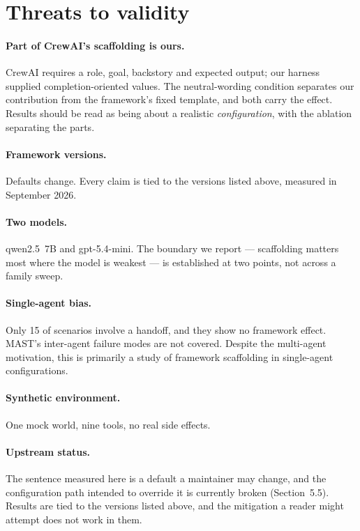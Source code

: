 \documentclass[10pt,twocolumn]{article}
\begin{document}
\section{Threats to validity}

\paragraph{Part of CrewAI's scaffolding is ours.} CrewAI requires a role, goal,
backstory and expected output; our harness supplied completion-oriented values.
The neutral-wording condition separates our contribution from the framework's
fixed template, and both carry the effect. Results should be read as being about
a realistic \emph{configuration}, with the ablation separating the parts.

\paragraph{Framework versions.} Defaults change. Every claim is tied to the
versions listed above, measured in September 2026.

\paragraph{Two models.} qwen2.5~7B and gpt-5.4-mini. The boundary we report ---
scaffolding matters most where the model is weakest --- is established at two
points, not across a family sweep.

\paragraph{Single-agent bias.} Only 15 of \nScenarios{}
scenarios involve a handoff, and they show no framework effect. MAST's
inter-agent failure modes are not covered. Despite the multi-agent motivation,
this is primarily a study of framework scaffolding in single-agent
configurations.

\paragraph{Synthetic environment.} One mock world, nine tools, no real side
effects.

\paragraph{Upstream status.} The sentence measured here is a default a
maintainer may change, and the configuration path intended to override it is
currently broken (Section~5.5). Results are tied to the versions listed above,
and the mitigation a reader might attempt does not work in them.
\end{document}
